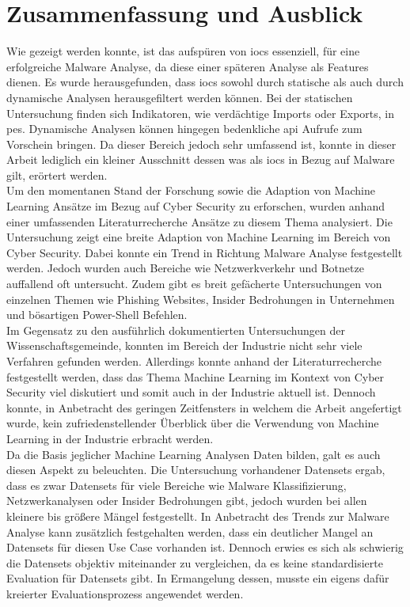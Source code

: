 \documentclass[
    12pt, %
    DIV10,
    ngerman, %
    a4paper, %
    oneside, %
    titlepage, %
    parskip=half, %
    headings=normal, %
    listof=totoc, %
    bibliography=totoc, %
    index=totoc, %
    captions=tableheading, %
    final %
]{scrreprt}
\begin{document}
\chapter{Zusammenfassung und Ausblick}
Wie gezeigt werden konnte, ist das aufspüren von \ac{iocs} essenziell, für eine erfolgreiche Malware Analyse, da diese einer späteren Analyse als Features dienen.
Es wurde herausgefunden, dass \ac{iocs} sowohl durch statische als auch durch dynamische Analysen herausgefiltert werden können. Bei der statischen Untersuchung finden sich Indikatoren, wie verdächtige Imports oder Exports, in \ac{pes}. Dynamische Analysen können hingegen bedenkliche \ac{api} Aufrufe zum Vorschein bringen. Da dieser Bereich jedoch sehr umfassend ist, konnte in dieser Arbeit lediglich ein kleiner Ausschnitt dessen was als \ac{iocs} in Bezug auf Malware gilt, erörtert werden.\\
Um den momentanen Stand der Forschung sowie die Adaption von Machine Learning Ansätze im Bezug auf Cyber Security zu erforschen, wurden anhand einer umfassenden Literaturrecherche Ansätze zu diesem Thema analysiert. Die Untersuchung zeigt eine breite Adaption von Machine Learning im Bereich von Cyber Security. Dabei konnte ein Trend in Richtung Malware Analyse festgestellt werden. Jedoch wurden auch Bereiche wie Netzwerkverkehr und Botnetze auffallend oft untersucht. Zudem gibt es breit gefächerte Untersuchungen von einzelnen Themen wie Phishing Websites, Insider Bedrohungen in Unternehmen und bösartigen Power-Shell Befehlen.\\
Im Gegensatz zu den ausführlich dokumentierten Untersuchungen der Wissenschaftsgemeinde, konnten im Bereich der Industrie nicht sehr viele Verfahren gefunden werden. Allerdings konnte anhand der Literaturrecherche festgestellt werden, dass das Thema Machine Learning im Kontext von Cyber Security viel diskutiert und somit auch in der Industrie aktuell ist. Dennoch konnte, in Anbetracht des geringen Zeitfensters in welchem die Arbeit angefertigt wurde, kein zufriedenstellender Überblick über die Verwendung von Machine Learning in der Industrie erbracht werden.\\
Da die Basis jeglicher Machine Learning Analysen Daten bilden, galt es auch diesen Aspekt zu beleuchten. Die Untersuchung vorhandener Datensets ergab, dass es zwar Datensets für viele Bereiche wie Malware Klassifizierung, Netzwerkanalysen oder Insider Bedrohungen gibt, jedoch wurden bei allen kleinere bis grö{\ss}ere Mängel festgestellt. In Anbetracht des Trends zur Malware Analyse kann zusätzlich festgehalten werden, dass ein deutlicher Mangel an Datensets für diesen Use Case vorhanden ist. Dennoch erwies es sich als schwierig die Datensets objektiv miteinander zu vergleichen, da es keine standardisierte Evaluation für Datensets gibt. In Ermangelung dessen, musste ein eigens dafür kreierter Evaluationsprozess angewendet werden.\\
\end{document}
